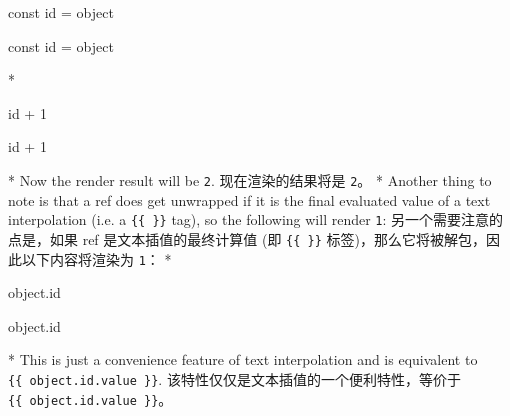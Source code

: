 \begin{paracol}{2}
\begin{codeJs}
const { id } = object
\end{codeJs}
\switchcolumn
\begin{codeJs}
const { id } = object
\end{codeJs}
\switchcolumn[0]*%
\begin{codeHtml}
{{ id + 1 }}
\end{codeHtml}
\switchcolumn
\begin{codeHtml}
{{ id + 1 }}
\end{codeHtml}
\switchcolumn[0]*%
Now the render result will be \texttt{2}.
\switchcolumn
现在渲染的结果将是 \texttt{2}。
\switchcolumn[0]*%
Another thing to note is that a ref does get unwrapped if it is the
final evaluated value of a text interpolation (i.e. a
\texttt{\{\{\ \}\}} tag), so the following will render \texttt{1}:
\switchcolumn
另一个需要注意的点是，如果 ref 是文本插值的最终计算值 (即
\texttt{\{\{\ \}\}} 标签)，那么它将被解包，因此以下内容将渲染为
\texttt{1}：
\switchcolumn[0]*%
\begin{codeHtml}
{{ object.id }}
\end{codeHtml}
\switchcolumn
\begin{codeHtml}
{{ object.id }}
\end{codeHtml}
\switchcolumn[0]*%
This is just a convenience feature of text interpolation and is
equivalent to \texttt{\{\{\ object.id.value\ \}\}}.
\switchcolumn
该特性仅仅是文本插值的一个便利特性，等价于
\texttt{\{\{\ object.id.value\ \}\}}。
\end{paracol}
 